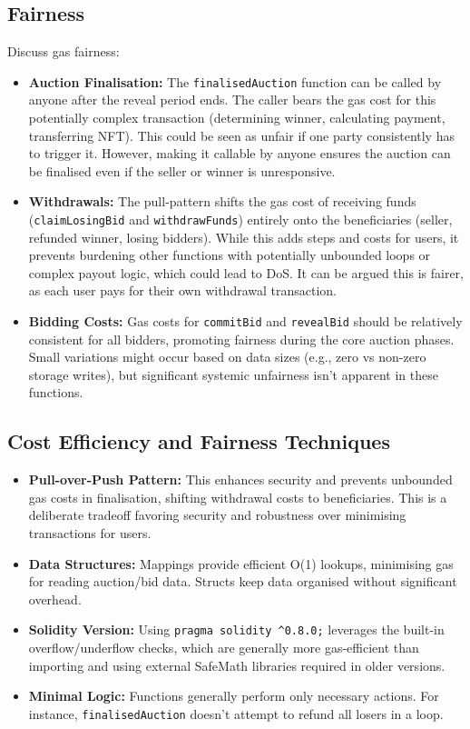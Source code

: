 \documentclass[11pt, a4paper]{article}
\begin{document}
\subsection{Fairness}
Discuss gas fairness:
\begin{itemize}
    \item \textbf{Auction Finalisation:} The \texttt{finalisedAuction} function can be called by anyone after the reveal period ends. The caller bears the gas cost for this potentially complex transaction (determining winner, calculating payment, transferring NFT). This could be seen as unfair if one party consistently has to trigger it. However, making it callable by anyone ensures the auction can be finalised even if the seller or winner is unresponsive.
    \item \textbf{Withdrawals:} The pull-pattern shifts the gas cost of receiving funds (\texttt{claimLosingBid} and \texttt{withdrawFunds}) entirely onto the beneficiaries (seller, refunded winner, losing bidders). While this adds steps and costs for users, it prevents burdening other functions with potentially unbounded loops or complex payout logic, which could lead to DoS. It can be argued this is fairer, as each user pays for their own withdrawal transaction.
    \item \textbf{Bidding Costs:} Gas costs for \texttt{commitBid} and \texttt{revealBid} should be relatively consistent for all bidders, promoting fairness during the core auction phases. Small variations might occur based on data sizes (e.g., zero vs non-zero storage writes), but significant systemic unfairness isn't apparent in these functions.
\end{itemize}


\subsection{Cost Efficiency and Fairness Techniques}
\begin{itemize}
    \item \textbf{Pull-over-Push Pattern:} This enhances security and prevents unbounded gas costs in finalisation, shifting withdrawal costs to beneficiaries. This is a deliberate tradeoff favoring security and robustness over minimising transactions for users.
    \item \textbf{Data Structures:} Mappings provide efficient O(1) lookups, minimising gas for reading auction/bid data. Structs keep data organised without significant overhead.
    \item \textbf{Solidity Version:} Using \texttt{pragma solidity \^{}0.8.0;} leverages the built-in overflow/\newline underflow checks, which are generally more gas-efficient than importing and using external SafeMath libraries required in older versions.
    \item \textbf{Minimal Logic:} Functions generally perform only necessary actions. For instance, \texttt{finalisedAuction} doesn't attempt to refund all losers in a loop.
\end{itemize}
\end{document}
